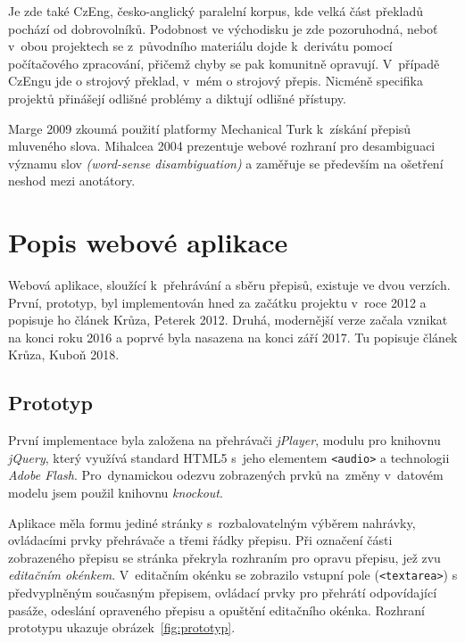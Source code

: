 Je zde také CzEng\cite{bojar2008czeng}, česko-anglický paralelní korpus, kde
velká část překladů pochází od dobrovolníků. Podobnost ve východisku je zde
pozoruhodná, neboť v~obou projektech se z~původního materiálu dojde k~derivátu
pomocí počítačového zpracování, přičemž chyby se pak komunitně opravují.
V~případě CzEngu jde o strojový překlad, v~mém o strojový přepis. Nicméně
specifika projektů přinášejí odlišné problémy a diktují odlišné přístupy.

Marge 2009\cite{5494979} zkoumá použití platformy Mechanical Turk k~získání
přepisů mluveného slova. Mihalcea 2004\cite{mihalcea2004building} prezentuje
webové rozhraní pro desambiguaci významu slov {\em (word-sense disambiguation)} a
zaměřuje se především na ošetření neshod mezi anotátory.

\section{Popis webové aplikace}

Webová aplikace, sloužící k~přehrávání a sběru přepisů, existuje ve dvou
verzích. První, prototyp, byl implementován hned za začátku projektu v~roce
2012 a popisuje ho článek Krůza, Peterek 2012\cite{kruuza2012making}. Druhá,
modernější verze začala vznikat na konci roku 2016 a poprvé byla nasazena na
konci září 2017. Tu popisuje článek Krůza, Kuboň
2018\cite{biblio:KrKuSecondGenerationWeb2018}.

\subsection{Prototyp}

První implementace byla založena na přehrávači \textit{jPlayer}, modulu pro
knihovnu \textit{jQuery}, který využívá standard HTML5 s~jeho elementem
\texttt{<audio>} a technologii \textit{Adobe Flash}. Pro~dynamickou odezvu
zobrazených prvků na~změny v~datovém modelu jsem použil knihovnu
\textit{knockout}.

Aplikace měla formu jediné stránky s~rozbalovatelným výběrem nahrávky,
ovládacími prvky přehrávače a třemi řádky přepisu. Při označení části
zobrazeného přepisu se stránka překryla rozhraním pro opravu přepisu, jež zvu
\textit{editačním okénkem}. V~editačním okénku se zobrazilo vstupní pole
(\texttt{<textarea>}) s předvyplněným současným přepisem, ovládací prvky pro
přehrátí odpovídající pasáže, odeslání opraveného přepisu a opuštění editačního
okénka.
Rozhraní prototypu ukazuje obrázek~\ref{fig:prototyp}.

